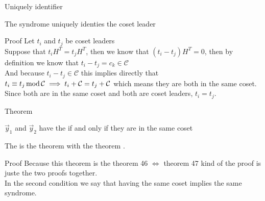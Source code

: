 \begin{parag}{Uniquely identifier}
    \begin{theoreme}
    The syndrome uniquely identies the coset leader
    \end{theoreme}
    \begin{subparag}{Proof}
        Let $t_i$ and $t_j$ be coset leaders\\
	Suppose that $t_iH^T = t_j H^T$, then we know that $\left(t_i - t_j\right)H^T = 0$, then by definition we know that $t_i - t_j = c_k \in \mathcal{C}$\\
	And because $t_i - t_j \in \mathcal{C}$ this implies directly that $t_i \equiv t_j \operatorname{mod} \mathcal{C} \implies t_i + \mathcal{C} = t_j + \mathcal{C}$ which means they are both in the same coset. Since both are in the same coset and both are coset leaders, $t_i = t_j$.
    \end{subparag}
\end{parag}



\begin{parag}{Theorem}
    \begin{theoreme}
    $\vec{y}_1$ and $\vec{y}_2$ have the  if and only if they are in the same coset  
    \end{theoreme}
    The is the theorem  with the theorem .
    \begin{subparag}{Proof}
        Because this theorem is the theorem 46 $\iff$ theorem 47 kind of the proof is juste the two proofs together. \\
        In the second condition we say that having the same coset implies the same syndrome.
    \end{subparag}
\end{parag}





